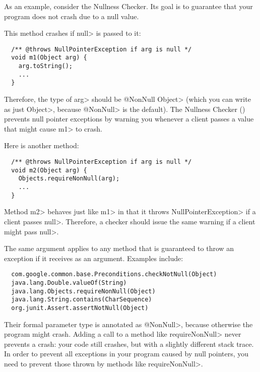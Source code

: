 
As an example, consider the Nullness Checker.  Its goal is to guarantee that your
program does not crash due to a null value.

This method crashes if \<null> is passed to it:

\begin{Verbatim}
  /** @throws NullPointerException if arg is null */
  void m1(Object arg) {
    arg.toString();
    ...
  }
\end{Verbatim}

\noindent
Therefore, the type of \<arg>
should be \<@NonNull Object> (which you can write as just \<Object>, because
\<@NonNull> is the default).  The Nullness Checker ()
prevents null pointer exceptions by warning you whenever a client passes a
value that might cause \<m1> to crash.

Here is another method:

\begin{Verbatim}
  /** @throws NullPointerException if arg is null */
  void m2(Object arg) {
    Objects.requireNonNull(arg);
    ...
  }
\end{Verbatim}

Method \<m2> behaves just like \<m1> in that it throws
\<NullPointerException> if a client passes \<null>.  Therefore, a checker
should issue the same warning if a client might pass \<null>.

The same argument applies to any method that is guaranteed to throw an exception
if it receives  as an argument.  Examples include:

\begin{Verbatim}
  com.google.common.base.Preconditions.checkNotNull(Object)
  java.lang.Double.valueOf(String)
  java.lang.Objects.requireNonNull(Object)
  java.lang.String.contains(CharSequence)
  org.junit.Assert.assertNotNull(Object)
\end{Verbatim}

Their formal parameter type is annotated as \<@NonNull>, because otherwise the
program might crash.  Adding a call to a method like \<requireNonNull>
never prevents a crash:  your code still crashes, but with a slightly
different stack trace.  In order to prevent all exceptions in your program
caused by null pointers, you need to prevent those thrown by methods like
\<requireNonNull>.

